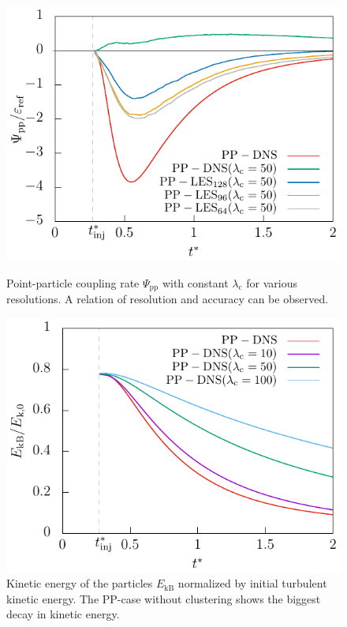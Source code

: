 \documentclass[11pt,a4paper,openany,oneside,parskip=half*]{article}
\begin{document}
\begin{figure}[]
    \centering
     \begin{minipage}[t]{0.5\textwidth}
        \centering
        \includegraphics[width=\linewidth]{./Abbildungen/vergleich_coupling_time50.pdf}
        \caption{Point-particle coupling rate $\Psi_\mathrm{pp}$ with constant $\lambda_\mathrm{c}$ for various resolutions. A relation of resolution and accuracy can be observed.}
        \label{vergleich_coupling_time_256}
        \end{minipage}%
    \begin{minipage}[t]{.5\textwidth}
         \centering
        \includegraphics[width=\linewidth]{./Abbildungen/256/particlekineticenergy_time.pdf}
        \caption{Kinetic energy of the particles $E_\mathrm{kB}$ normalized by initial turbulent kinetic energy. The PP-case without clustering shows the biggest decay in kinetic energy. }
        \label{particlekineticenergy_time_256}
    \end{minipage}
\end{figure}
\end{document}
